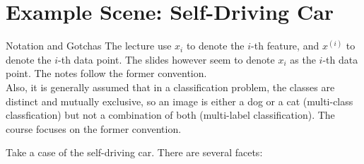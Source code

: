 \section{Example Scene: Self-Driving Car}
\begin{commentbox}{Notation and Gotchas}
    The lecture use $x_i$ to denote the $i$-th feature, and $x^{(i)}$ to denote the $i$-th data point. The slides however seem to denote $x_i$ as the $i$-th data point. The notes follow the former convention.\\

    Also, it is generally assumed that in a classification problem, the classes are distinct and mutually exclusive, so an image is either a dog or a cat (multi-class classfication) but not a combination of both (multi-label classification). The course focuses on the former convention.

\end{commentbox}
Take a case of the self-driving car. There are several facets:
